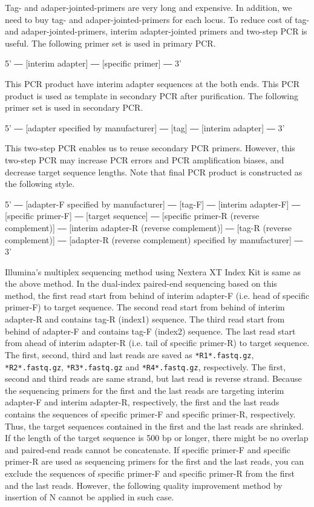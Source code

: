 \documentclass[titlepage,10pt,a4paper,english]{jsbook}
\newenvironment{pre}{\begin{leftbar}\raggedright\ttfamily\footnotesize\setlength{\baselineskip}{1.4em}}{\end{leftbar}\vspace{-1em}}
\begin{document}
Tag- and adaper-jointed-primers are very long and expensive.
In addition, we need to buy tag- and adaper-jointed-primers for each locus.
To reduce cost of tag- and adaper-jointed-primers, interim adapter-jointed primers and two-step PCR is useful.
The following primer set is used in primary PCR.
\begin{pre}
5' ― [interim adapter] ― [specific primer] ― 3'
\end{pre}
This PCR product have interim adapter sequences at the both ends.
This PCR product is used as template in secondary PCR after purification.
The following primer set is used in secondary PCR.
\begin{pre}
5' ― [adapter specified by manufacturer] ― [tag] ― [interim adapter] ― 3'
\end{pre}
This two-step PCR enables us to reuse secondary PCR primers.
However, this two-step PCR may increase PCR errors and PCR amplification biases, and decrease target sequence lengths.
Note that final PCR product is constructed as the following style.
\begin{pre}
5' ― [adapter-F specified by manufacturer] ― [tag-F] ― [interim adapter-F] ― [specific primer-F] ― [target sequence] ― [specific primer-R (reverse complement)] ― [interim adapter-R (reverse complement)] ― [tag-R (reverse complement)] ― [adapter-R (reverse complement) specified by manufacturer] ― 3'
\end{pre}
Illumina's multiplex sequencing method \citep{Illumina2013} using Nextera XT Index Kit is same as the above method.
In the dual-index paired-end sequencing based on this method, the first read start from behind of interim adapter-F (i.e. head of specific primer-F) to target sequence.
The second read start from behind of interim adapter-R and contains tag-R (index1) sequence.
The third read start from behind of adapter-F and contains tag-F (index2) sequence.
The last read start from ahead of interim adapter-R (i.e. tail of specific primer-R) to target sequence.
The first, second, third and last reads are saved as \texttt{*{\textunderscore}R1{\textunderscore}*.fastq.gz}, \texttt{*{\textunderscore}R2{\textunderscore}*.fastq.gz}, \texttt{*{\textunderscore}R3{\textunderscore}*.fastq.gz} and \texttt{*{\textunderscore}R4{\textunderscore}*.fastq.gz}, respectively.
The first, second and third reads are same strand, but last read is reverse strand.
Because the sequencing primers for the first and the last reads are targeting interim adapter-F and interim adapter-R, respectively, the first and the last reads contains the sequences of specific primer-F and specific primer-R, respectively.
Thus, the target sequences contained in the first and the last reads are shrinked.
If the length of the target sequence is 500 bp or longer, there might be no overlap and paired-end reads cannot be concatenate.
If specific primer-F and specific primer-R are used as sequencing primers for the first and the last reads, you can exclude the sequences of specific primer-F and specific primer-R from the first and the last reads.
However, the following quality improvement method by insertion of N cannot be applied in such case.
\end{document}
